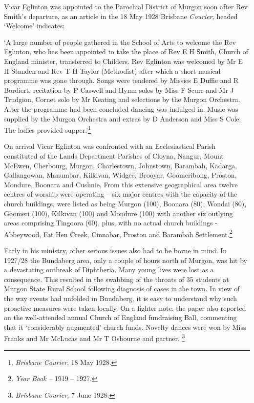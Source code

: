 Vicar Eglinton was appointed to the Parochial District of Murgon soon after Rev Smith's departure, as an article in the 18 May 1928 Brisbane \emph{Courier,} headed `Welcome' indicates:

`A large number of people gathered in the School of Arts to welcome the Rev Eglinton, who has been appointed to take the place of Rev E H Smith, Church of England minister, transferred to Childers. Rev Eglinton was welcomed by Mr E H Standen and Rev T H Taylor (Methodist) after which a short musical programme was gone through. Songs were tendered by Missies E Duffie and R Bordiert, recitation by P Caswell and Hymn solos by Miss F Scurr and Mr J Trudgion, Cornet solo by Mr Keating and selections by the Murgon Orchestra. After the programme had been concluded dancing was indulged in. Music was supplied by the Murgon Orchestra and extras by D Anderson and Miss S Cole. The ladies provided supper.'\footnote{\emph{Brisbane Courier}, 18 May 1928.}

On arrival Vicar Eglinton was confronted with an Ecclesiastical Parish constituted of the Lands Department Parishes of Cloyna, Nangur, Mount McEwen, Cherbourg, Murgon, Charlestown, Johnstown, Barambah, Kadarga, Gallangowan, Manumbar, Kilkivan, Widgee, Brooyar, Goomeribong, Proston, Mondure, Boonara and Cushnie, From this extensive geographical area twelve centres of worship were operating -- six major centres with the capacity of the church buildings, were listed as being Murgon (100), Boonara (80), Wondai (80), Goomeri (100), Kilkivan (100) and Mondure (100) with another six outlying areas comprising Tingoora (60), plus, with no actual church buildings - Abbeywood, Fat Hen Creek, Cinnabar, Proston and Barambah Settlement.\footnote{\emph{Year Book --} 1919 -- 1927.}

Early in his ministry, other serious issues also had to be borne in mind. In 1927/28 the Bundaberg area, only a couple of hours north of Murgon, was hit by a devastating outbreak of Diphtheria. Many young lives were lost as a consequence. This resulted in the swabbing of the throats of 35 students at Murgon State Rural School following diagnosis of cases in the town. In view of the way events had unfolded in Bundaberg, it is easy to understand why such proactive measures were taken locally. On a lighter note, the paper also reported on the well-attended annual Church of England fundraising Ball, commenting that it `considerably augmented' church funds. Novelty dances were won by Miss Franks and Mr McLucas and Mr T Osbourne and partner. \footnote{\emph{Brisbane Courier,} 7 June 1928\emph{.}}

